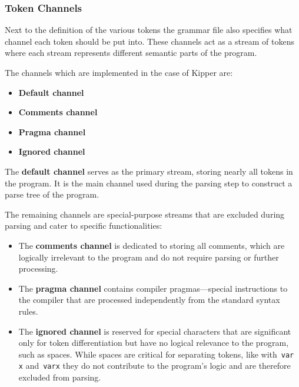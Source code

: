 
\subsubsection{Token Channels}
\label{sec:token-channels}

Next to the definition of the various tokens the grammar file also specifies what channel each token should be put into. These channels act as a stream of tokens where each stream represents different semantic parts of the program.

The channels which are implemented in the case of Kipper are:

\begin{itemize}
	\item \textbf{Default channel}
	\item \textbf{Comments channel}
	\item \textbf{Pragma channel}
	\item \textbf{Ignored channel}
\end{itemize}

The \textbf{default channel} serves as the primary stream, storing nearly all tokens in the program. It is the main channel used during the parsing step to construct a parse tree of the program.

The remaining channels are special-purpose streams that are excluded during parsing and cater to specific functionalities:

\begin{itemize}
	\item The \textbf{comments channel} is dedicated to storing all comments, which are logically irrelevant to the program and do not require parsing or further processing.
	\item The \textbf{pragma channel} contains compiler pragmas—special instructions to the compiler that are processed independently from the standard syntax rules.
	\item The \textbf{ignored channel} is reserved for special characters that are significant only for token differentiation but have no logical relevance to the program, such as spaces. While spaces are critical for separating tokens, like with~\lstinline|var x| and~\lstinline|varx| they do not contribute to the program's logic and are therefore excluded from parsing.
\end{itemize}
	
